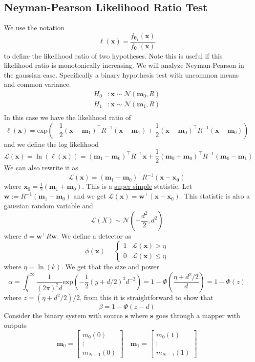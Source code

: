 \documentclass[a4paper]{article}
\begin{document}
\subsection*{Neyman-Pearson Likelihood Ratio Test}%
We use the notation
\[
  \ell(\bm{x}) = \frac{f_{\bm{\theta}_1}(\bm{x})}{f_{\bm{\theta}_0}(\bm{x})}
\]
to define the likelihood ratio of two hypotheses. Note this is useful if this likelihood ratio is monotonically increasing. We will analyze Neyman-Pearson in the gaussian case. Specifically a binary hypothesis test with uncommon means and common variance.
\[
  \begin{aligned}
    H_0 &: \bm{x} \sim \mathcal{N} \left( \bm{m}_0, R \right) \\
    H_1 &: \bm{x} \sim \mathcal{N} \left( \bm{m}_1, R \right) \\
  \end{aligned}
\]
In this case we have the likelihood ratio of
\[
  \ell(\bm{x}) = \text{exp} \left( -\frac{1}{2}(\bm{x} - \bm{m}_1)^\top R^{-1} (\bm{x} - \bm{m}_1) + \frac{1}{2}(\bm{x} - \bm{m}_0)^\top R^{-1} (\bm{x} - \bm{m}_0)\right)
\] 
and we define the log likelihood
\[
  \mathcal{L}(\bm{x}) = \ln \left( \ell(\bm{x}) \right)= (\bm{m}_1 - \bm{m}_0)^\top R^{-1} \bm{x} + \frac{1}{2} (\bm{m}_0 + \bm{m}_0)^\top R^{-1}(\bm{m}_0 - \bm{m}_1)
\]
We can also rewrite it as
\[
  \mathcal{L}(\bm{x}) = (\bm{m}_1 - \bm{m}_0)^\top R^{-1} (\bm{x} - \bm{x_0})
\]
where $\bm{x}_0 = \frac{1}{2} (\bm{m}_1 + \bm{m}_0)$. This is a \underline{super simple} statistic. Let $\bm{w} := R^{-1}(\bm{m}_1 - \bm{m}_0)$ and we get $\mathcal{L}(\bm{x}) = \bm{w}^\top (\bm{x} - \bm{x}_0)$. This statistic is also a gaussian random variable and 
\[
  \mathcal{L}(X) \sim \mathcal{N} \left( - \frac{d^2}{2}, d^2 \right)
\]
where $d = \bm{w}^\top R \bm{w}$. We define a detector as
\[
  \phi(\bm{x}) = 
  \begin{cases}
    1 & \mathcal{L}(\bm{x}) > \eta \\
    0 & \mathcal{L}(\bm{x}) \leq \eta
  \end{cases}
\]
where $\eta = \ln(k)$.
We get that the size and power
\[
  \alpha = \int_{\eta}^{\infty} \frac{1}{(2\pi)^2 d} \text{exp} \left( -\frac{1}{2} (y + d/2)^2d^{-2} \right) = 1 - \Phi \left( \frac{\eta + d^2/2}{d} \right) = 1 - \Phi(z)
\]
where $z = (\eta + d^2/2)/2$, from this it is straightforward to show that
\[
  \beta = 1 - \Phi(z - d)
\]
Consider the binary system with source $\bm{s}$ where $\bm{s}$ goes through a mapper with outputs
\[
  \bm{m}_0 =
  \begin{bmatrix}
    m_0(0) \\
    \vdots \\
    m_{N-1}(0)
  \end{bmatrix}
  \quad 
  \bm{m}_1 =
  \begin{bmatrix}
    m_0(1) \\
    \vdots \\
    m_{N-1}(1)
  \end{bmatrix}
\]
\end{document}

